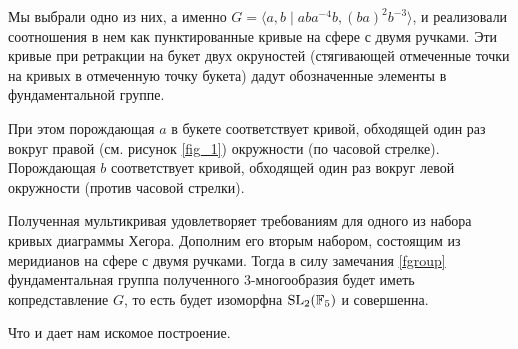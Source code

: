\documentclass[a4paper, 12pt]{article}
\theoremstyle{definition}
\begin{document}
    Мы выбрали одно из них, а именно $G = \langle a, b \mid a b a^{-4} b, (b a)^2 b^{-3} \rangle$, и реализовали соотношения в нем как пунктированные кривые на сфере с двумя ручками. Эти кривые при ретракции на букет двух окруностей (стягивающей отмеченные точки на кривых в отмеченную точку букета) дадут обозначенные элементы в фундаментальной группе. 
    
    При этом порождающая $a$ в букете соответствует кривой, обходящей один раз вокруг правой (см. рисунок \ref{fig_1}) окружности (по часовой стрелке). Порождающая $b$ соответствует кривой, обходящей один раз вокруг левой окружности (против часовой стрелки).

    Полученная мультикривая удовлетворяет требованиям для одного из набора кривых диаграммы Хегора. Дополним его вторым набором, состоящим из меридианов на сфере с двумя ручками. Тогда в силу замечания \ref{fgroup} фундаментальная группа полученного 3-многообразия будет иметь копредставление $G$, то есть будет изоморфна $\textnormal{SL}_2(\mathbb{F}_5)$ и совершенна.

    Что и дает нам искомое построение.

\printbibliography

\end{document}
